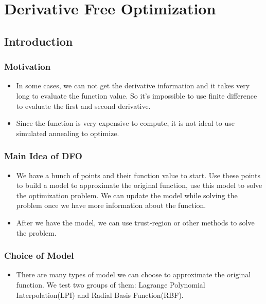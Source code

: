 \documentclass[hyperref={pdfpagelabels=false}]{beamer}
\begin{document}
\section{Derivative Free Optimization}

\subsection{Introduction}

\begin{frame}
\frametitle{Motivation}
\begin{itemize}
\item In some cases, we can not get the derivative information and it takes very long to evaluate the function value. So it's impossible to use finite difference to evaluate the first and second derivative. 
\item Since the function is very expensive to compute, it is not ideal to use simulated annealing to optimize.
\end{itemize}
\end{frame}


\begin{frame}
\frametitle{Main Idea of DFO}
\begin{itemize}
\item We have a bunch of points and their function value to start. Use these points to build a model to approximate the original function, use this model to solve the optimization problem. We can update the model while solving the problem once we have more information about the function.
\item After we have the model, we can use trust-region or other methods to solve the problem.
\end{itemize}
\end{frame}


\begin{frame}
\frametitle{Choice of Model}
\begin{itemize}
\item There are many types of model we can choose to approximate the original function. We test two groups of them: Lagrange Polynomial Interpolation(LPI) and Radial Basis Function(RBF).
\end{itemize}
\end{frame}
\end{document}
